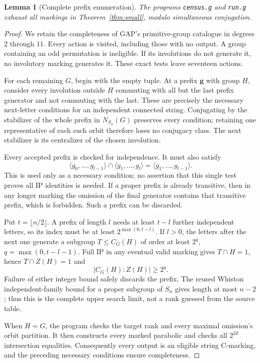\documentclass[11pt,a4paper]{article}
\newtheorem{lemma}{Lemma}
\newcommand{\gen}[1]{\langle#1\rangle}
\begin{document}
\begin{lemma}[Complete prefix enumeration]\label{lem:engine}
The programs \texttt{census.g} and \texttt{run.g} exhaust all markings
in Theorem~\ref{thm:small}, modulo simultaneous conjugation.
\end{lemma}
\begin{proof}
We retain the completeness of GAP's primitive-group catalogue in
degrees $2$ through $11$. Every action is visited, including those
with no output. A group containing an odd permutation is ineligible.
If its involutions do not generate it, no involutory marking generates
it. These exact tests leave seventeen actions.

For each remaining $G$, begin with the empty tuple. At a prefix
$\mathbf g$ with group $H$, consider every involution outside $H$
commuting with all but the last prefix generator and not commuting
with the last. These are precisely the necessary next-letter
conditions for an independent connected string. Conjugating by the
stabilizer of the whole prefix in $N_{S_n}(G)$ preserves every
condition; retaining one representative of each such orbit therefore
loses no conjugacy class. The next stabilizer is its centralizer of
the chosen involution.

Every accepted prefix is checked for independence. It must also
satisfy
\[
 \gen{g_0,\ldots,g_{l-1}}\cap\gen{g_1,\ldots,g_l}
       =\gen{g_1,\ldots,g_{l-1}}.
\]
This is used only as a necessary condition; no assertion that this
single test proves all IP identities is needed. If a proper prefix
is already transitive, then in any longer marking the omission of
the final generator contains that transitive prefix, which is
forbidden. Such a prefix can be discarded.

Put $t=\lfloor n/2\rfloor$. A prefix of length $l$ needs at least
$t-l$ further independent letters, so its index must be at least
$2^{\max(0,t-l)}$. If $l>0$, the letters after the next one generate
a subgroup $T\leq C_G(H)$ of order at least
$2^{q}$, $q=\max(0,t-l-1)$. Full IP in any eventual valid marking
gives $T\cap H=1$, hence $T\cap Z(H)=1$ and
\[
                     |C_G(H):Z(H)|\geq2^q.
\]
Failure of either integer bound safely discards the prefix.
The reused Whiston independent-family bound for a proper subgroup
of $S_n$ gives length at most $n-2$; thus this is the complete
upper search limit, not a rank guessed from the source table.

When $H=G$, the program checks the target rank and every maximal
omission's orbit partition. It then constructs every marked
parabolic and checks all $2^{2d}$ intersection equalities.
Consequently every output is an eligible string C-marking, and
the preceding necessary conditions ensure completeness.
\end{proof}
\end{document}
